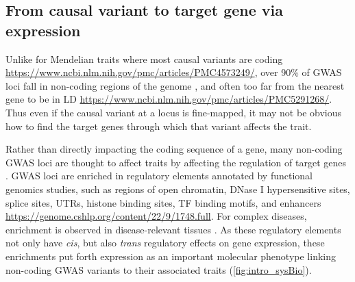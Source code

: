 \begin{outline}
\subsection{From causal variant to target gene via expression}

\1 Unlike for Mendelian traits where most causal variants are coding \url{https://www.ncbi.nlm.nih.gov/pmc/articles/PMC4573249/}, 
over 90\% of \gls{GWAS} loci fall in non-coding regions of the genome \autocite{gallagher2018PostGWASEraAssociation},
and often too far from the nearest gene to be in \gls{LD} \url{https://www.ncbi.nlm.nih.gov/pmc/articles/PMC5291268/}.
Thus even if the causal variant at a locus is fine-mapped, 
it may not be obvious how to find the target genes through which that variant affects the trait.
%

\1 Rather than directly impacting the coding sequence of a gene, 
many non-coding GWAS loci are thought to affect traits by affecting the regulation of target genes \autocite{gallagher2018PostGWASEraAssociation}.
\gls{GWAS} loci are enriched in regulatory elements annotated by functional genomics studies, such as
    regions of open chromatin, 
    DNase I hypersensitive sites,
    splice sites, UTRs,
    histone binding sites, 
    \gls{TF} binding motifs,
    and enhancers \autocite{trynka2015DisentanglingEffectsColocalizing,gallagher2018PostGWASEraAssociation} \url{https://genome.cshlp.org/content/22/9/1748.full}.
For complex diseases, enrichment is observed in disease-relevant tissues \autocite{visscher201710YearsGWAS}.
As these regulatory elements not only have \textit{cis}, but also \textit{trans} regulatory effects on gene expression,
these enrichments put forth expression as an important molecular phenotype linking non-coding \gls{GWAS} variants to their associated traits (\autoref{fig:intro_sysBio}).


\end{outline}

